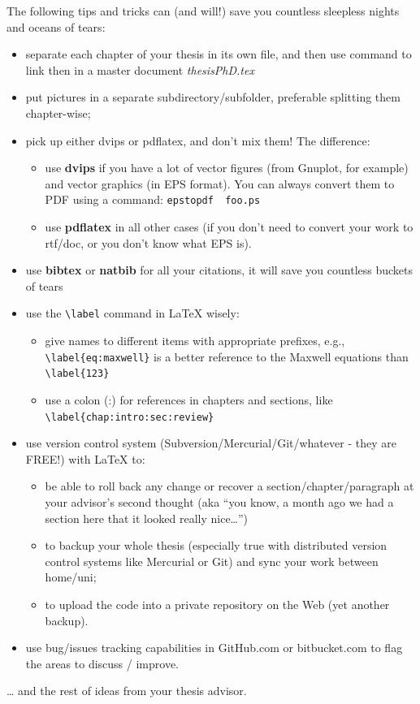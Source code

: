 \documentclass[a4paper,11pt,phdthesis,twoside,oneandhalfspace]{cssethesis}  %
\begin{document}
The following tips and tricks can (and will!) save you countless
sleepless nights and oceans of tears:

\begin{itemize}
\item
  separate each chapter of your thesis in its own file, and then use
  \verb|| command to link then in a master document
  \emph{thesisPhD.tex}
\item
  put pictures in a separate subdirectory/subfolder, preferable
  splitting them chapter-wise;
\item
  pick up either dvips or pdflatex,
  and don't mix them!
  The difference:
  \begin{itemize}
  \item
    use \textbf{dvips} if you have a lot of vector figures (from
    Gnuplot, for example) and vector graphics (in EPS format). You can
    always convert them to PDF using a command: \verb|epstopdf  foo.ps|
  \item
    use \textbf{pdflatex} in all other cases (if you don't need to
    convert your work to rtf/doc, or you don't know what EPS is).
  \end{itemize}
\item
  use \textbf{bibtex} or \textbf{natbib} for all your citations, it
  will save you countless buckets of tears
\item
  use the \verb|\label| command in LaTeX wisely:
  \begin{itemize}
  \item
    give names to different items with appropriate prefixes, e.g.,
    \verb|\label{eq:maxwell}| is a better reference to the Maxwell equations
    than \verb|\label{123}|
  \item
    use a colon (:) for references in chapters and sections, like
    \verb|\label{chap:intro:sec:review}|
  \end{itemize}
\item
  use version control system (Subversion/Mercurial/Git/whatever -
  they are FREE!) with LaTeX to:
  \begin{itemize}
  \item
    be able to roll back any change or recover a
    section/chapter/paragraph at your advisor's second thought (aka
    ``you know, a month ago we had a section here that it looked really nice\ldots{}'')
  \item
    to backup your whole thesis (especially true with distributed
    version control systems like Mercurial or Git) and sync your work
    between home/uni;
  \item
    to upload the code into a private repository on the Web (yet
    another backup).
  \end{itemize}
\item
  use bug/issues tracking capabilities in GitHub.com or bitbucket.com
  to flag the areas to discuss / improve.
\end{itemize}
\ldots{} and the rest of ideas from your thesis advisor.
\end{document}
